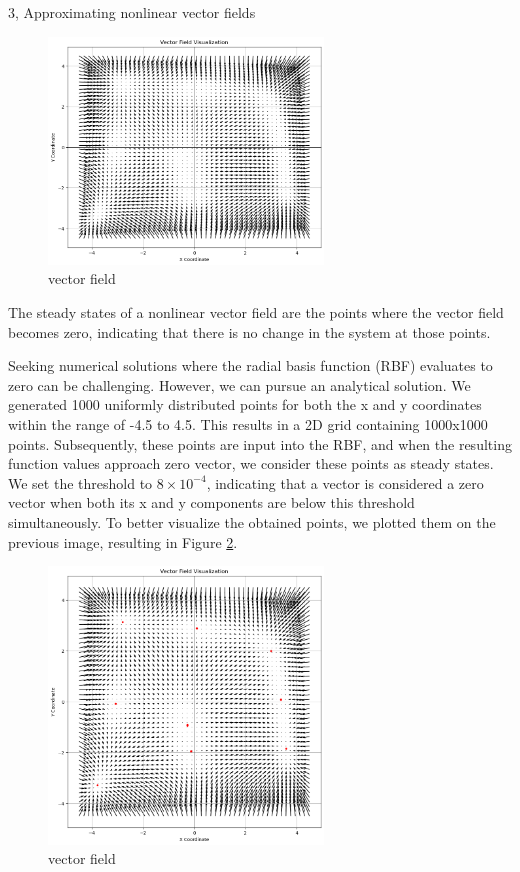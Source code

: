 \begin{task}{3, Approximating nonlinear vector fields}
\begin{figure}[H]
\centering
\includegraphics[width=0.65\textwidth]{images/nonlinear_vector_fields4.png}
\caption{vector field}
\label{fig:3.4}
\end{figure}

The steady states of a nonlinear vector field are the points where the vector field becomes zero, indicating that there is no change in the system at those points.

Seeking numerical solutions where the radial basis function (RBF) evaluates to zero can be challenging. However, we can pursue an analytical solution. We generated 1000 uniformly distributed points for both the x and y coordinates within the range of -4.5 to 4.5. This results in a 2D grid containing 1000x1000 points. Subsequently, these points are input into the RBF, and when the resulting function values approach zero vector, we consider these points as steady states. We set the threshold to \(8 \times 10^{-4}\), indicating that a vector is considered a zero vector when both its x and y components are below this threshold simultaneously. To better visualize the obtained points, we plotted them on the previous image, resulting in Figure \ref{fig:3.5}.

\begin{figure}[H]
\centering
\includegraphics[width=0.65\textwidth]{images/nonlinear_vector_fields5.png}
\caption{vector field}
\label{fig:3.5}
\end{figure}


\end{task}
